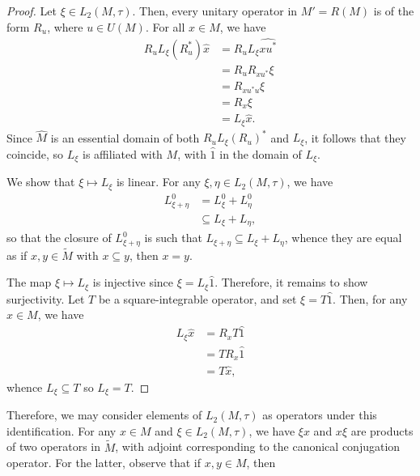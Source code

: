 \documentclass[10pt]{mypackage}
\begin{document}
\begin{proof}
  Let $\xi\in L_2\left( M,\tau \right)$. Then, every unitary operator in $M' = R\left( M \right)$ is of the form $R_u$, where $u\in U(M)$. For all $x\in M$, we have
  \begin{align*}
    R_uL_{\xi}\left( R_u^{\ast} \right)\hat{x} &= R_uL_{\xi} \widehat{xu^{\ast}}\\
                                               &= R_uR_{xu^{\ast}}\xi\\
                                               &= R_{xu^{\ast}u}\xi\\
                                               &= R_x\xi\\
                                               &= L_{\xi}\hat{x}.
  \end{align*}
  Since $\widehat{M}$ is an essential domain of both $R_uL_{\xi}\left( R_u \right)^{\ast}$ and $L_{\xi}$, it follows that they coincide, so $L_{\xi}$ is affiliated with $M$, with $\hat{1}$ in the domain of $L_{\xi}$.

  We show that $\xi\mapsto L_{\xi}$ is linear. For any $\xi,\eta\in L_2\left( M,\tau \right)$, we have
  \begin{align*}
    L_{\xi + \eta}^{0} &= L_{\xi}^{0} + L_{\eta}^{0}\\
                       &\subseteq L_{\xi} + L_{\eta},
  \end{align*}
  so that the closure of $L_{\xi + \eta}^{0}$ is such that $L_{\xi + \eta}\subseteq L_{\xi} + L_{\eta}$, whence they are equal as if $x,y\in \widetilde{M}$ with $x\subseteq y$, then $x = y$.

  The map $\xi\mapsto L_{\xi}$ is injective since $\xi = L_{\xi}\hat{1}$. Therefore, it remains to show surjectivity. Let $T$ be a square-integrable operator, and set $\xi = T\hat{1}$. Then, for any $x\in M$, we have
  \begin{align*}
    L_{\xi}\hat{x} &= R_xT\hat{1}\\
                   &= TR_x\hat{1}\\
                   &= T\hat{x},
  \end{align*}
  whence $L_{\xi}\subseteq T$ so $L_{\xi} = T$.
\end{proof}
Therefore, we may consider elements of $L_2\left( M,\tau \right)$ as operators under this identification. For any $x\in M$ and $\xi\in L_2\left( M,\tau \right)$, we have $\xi x$ and $x\xi$ are products of two operators in $ \widetilde{M} $, with adjoint corresponding to the canonical conjugation operator. For the latter, observe that if $x,y\in M$, then
\end{document}
